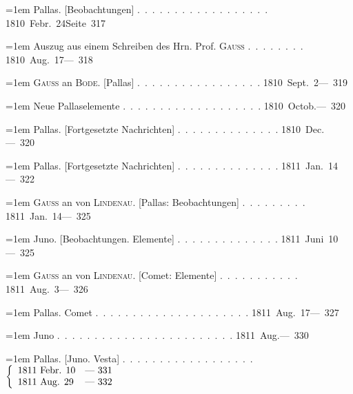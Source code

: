 \clearpage
{}
\begingroup
\raggedright
\noindent\hangindent=1em Pallas. [Beobachtungen] \mbox{.\ .\ .\ .\ .\ .\ .\ .\ .\ .\ .\ .\ .\ .\ .\ .\ .\ .} \hfill\mbox{1810 Febr. 24}\quad\mbox{Seite 317}\par\smallskip
\noindent\hangindent=1em Auszug aus einem Schreiben des Hrn. Prof. \textsc{Gauss} \mbox{.\ .\ .\ .\ .\ .\ .\ .} \hfill\mbox{1810 Aug. 17}\quad\mbox{--- 318}\par\smallskip
\noindent\hangindent=1em \textsc{Gauss} an \textsc{Bode}. [Pallas] \mbox{.\ .\ .\ .\ .\ .\ .\ .\ .\ .\ .\ .\ .\ .\ .\ .\ .} \hfill\mbox{1810 Sept. 2}\quad\mbox{--- 319}\par\smallskip
\noindent\hangindent=1em Neue Pallaselemente \mbox{.\ .\ .\ .\ .\ .\ .\ .\ .\ .\ .\ .\ .\ .\ .\ .\ .\ .\ .} \hfill\mbox{1810 Octob.}\quad\mbox{--- 320}\par\smallskip
\noindent\hangindent=1em Pallas. [Fortgesetzte Nachrichten] \mbox{.\ .\ .\ .\ .\ .\ .\ .\ .\ .\ .\ .\ .\ .} \hfill\mbox{1810 Dec.}\quad\mbox{--- 320}\par\smallskip
\noindent\hangindent=1em Pallas. [Fortgesetzte Nachrichten] \mbox{.\ .\ .\ .\ .\ .\ .\ .\ .\ .\ .\ .\ .\ .} \hfill\mbox{1811 Jan. 14}\quad\mbox{--- 322}\par\smallskip
\noindent\hangindent=1em \textsc{Gauss} an von \textsc{Lindenau}. [Pallas: Beobachtungen] \mbox{.\ .\ .\ .\ .\ .\ .\ .\ .} \hfill\mbox{1811 Jan. 14}\quad\mbox{--- 325}\par\smallskip
\noindent\hangindent=1em Juno. [Beobachtungen. Elemente] \mbox{.\ .\ .\ .\ .\ .\ .\ .\ .\ .\ .\ .\ .\ .} \hfill\mbox{1811 Juni 10}\quad\mbox{--- 325}\par\smallskip
\noindent\hangindent=1em \textsc{Gauss} an von \textsc{Lindenau}. [Comet: Elemente] \mbox{.\ .\ .\ .\ .\ .\ .\ .\ .\ .\ .} \hfill\mbox{1811 Aug. 3}\quad\mbox{--- 326}\par\smallskip
\noindent\hangindent=1em Pallas. Comet \mbox{.\ .\ .\ .\ .\ .\ .\ .\ .\ .\ .\ .\ .\ .\ .\ .\ .\ .\ .\ .\ .} \hfill\mbox{1811 Aug. 17}\quad\mbox{--- 327}\par\smallskip
\noindent\hangindent=1em Juno \mbox{.\ .\ .\ .\ .\ .\ .\ .\ .\ .\ .\ .\ .\ .\ .\ .\ .\ .\ .\ .\ .\ .\ .\ .} \hfill\mbox{1811 Aug.}\quad\mbox{--- 330}\par\smallskip
\noindent\hangindent=1em Pallas. [Juno. Vesta] \mbox{.\ .\ .\ .\ .\ .\ .\ .\ .\ .\ .\ .\ .\ .\ .\ .\ .\ .} \hfill\mbox{$\left\{\begin{array}{l@{\quad}l}\text{1811 Febr. 10}&\text{— 331}\\\text{1811 Aug. 29}&\text{— 332}\end{array}\right.$}\par\smallskip
